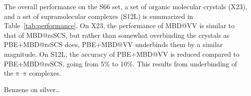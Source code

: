 The overall performance on the S66 set, a set of organic molecular crystals (X23), and a set of supramolecular complexes (S12L) is summarized in Table~\ref{tab:performance}.
On X23, the performance of MBD@VV is similar to that of MBD@rsSCS, but rather than somewhat overbinding the crystals as PBE+MBD@rsSCS does, PBE+MBD@VV underbinds them by a similar magnitude.
On S12L, the accuracy of PBE+MBD@VV is reduced compared to PBE+MBD@rsSCS, going from 5\% to 10\%.
This results from underbinding of the $\mathrm\pi$--$\mathrm\pi$ complexes.

Benzene on silver\ldots
